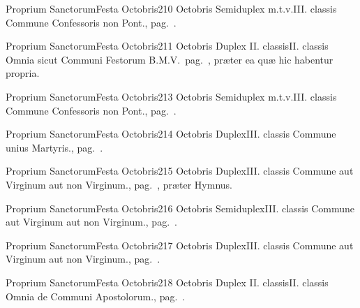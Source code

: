 \documentclass[nocturnale-romanum.tex]{subfiles}
\begin{document}
	{Proprium Sanctorum}{Festa Octobris}{2}{10 Octobris}
	{Semiduplex m.t.v.}{III. classis}
	{Commune Confessoris non Pont., pag.\ \pageref{M-CONP}.}
	{}

	{Proprium Sanctorum}{Festa Octobris}{2}{11 Octobris}
	{Duplex II. classis}{II. classis}
	{Omnia sicut Communi Festorum B.M.V.\ pag.\ \pageref{M-CBMV}, præter ea quæ hic habentur propria.}
	{}
\tedeumrubric

	{Proprium Sanctorum}{Festa Octobris}{2}{13 Octobris}
	{Semiduplex m.t.v.}{III. classis}
	{Commune Confessoris non Pont., pag.\ \pageref{M-CONP}.}
	{}

	{Proprium Sanctorum}{Festa Octobris}{2}{14 Octobris}
	{Duplex}{III. classis}
	{Commune unius Martyris., pag.\ \pageref{M-UMEX}.}
	{}

	{Proprium Sanctorum}{Festa Octobris}{2}{15 Octobris}
	{Duplex}{III. classis}
	{Commune aut Virginum aut non Virginum., pag.\ \pageref{M-MU}, præter Hymnus.}
	{}

	{Proprium Sanctorum}{Festa Octobris}{2}{16 Octobris}
	{Semiduplex}{III. classis}
	{Commune aut Virginum aut non Virginum., pag.\ \pageref{M-MU}.}
	{}

	{Proprium Sanctorum}{Festa Octobris}{2}{17 Octobris}
	{Duplex}{III. classis}
	{Commune aut Virginum aut non Virginum., pag.\ \pageref{M-MU}.}
	{}

	{Proprium Sanctorum}{Festa Octobris}{2}{18 Octobris}
	{Duplex II. classis}{II. classis}
	{Omnia de Communi Apostolorum., pag.\ \pageref{M-APEX}.}
	{}
\end{document}
